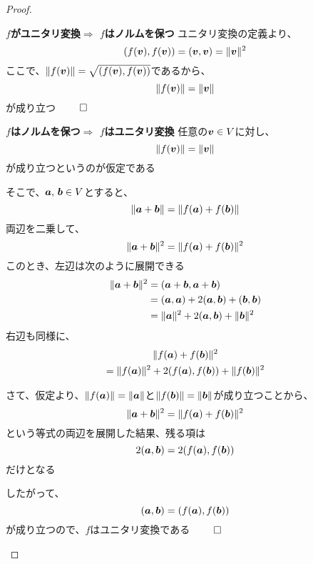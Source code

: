 \documentclass[../../../topic_linear-algebra]{subfiles}
\begin{document}
\begin{proof}
  \begin{subpattern}{\bfseries $f$がユニタリ変換$\Longrightarrow$ $f$はノルムを保つ}
    ユニタリ変換の定義より、
    \begin{equation*}
      (f(\vb*{v}),f(\vb*{v})) = (\vb*{v},\vb*{v}) = \|\vb*{v}\|^2
    \end{equation*}
    ここで、$\|f(\vb*{v})\| = \sqrt{(f(\vb*{v}),f(\vb*{v}))}$であるから、
    \begin{equation*}
      \|f(\vb*{v})\| = \|\vb*{v}\|
    \end{equation*}
    が成り立つ $\qed$
  \end{subpattern}

  \begin{subpattern}{\bfseries $f$はノルムを保つ$\Longrightarrow$ $f$はユニタリ変換}
    任意の$\vb*{v} \in V$に対し、
    \begin{equation*}
      \|f(\vb*{v})\| = \|\vb*{v}\|
    \end{equation*}
    が成り立つというのが仮定である

    そこで、$\vb*{a},\,\vb*{b} \in V$とすると、
    \begin{equation*}
      \|\vb*{a} + \vb*{b} \| = \|f(\vb*{a}) + f(\vb*{b})\|
    \end{equation*}
    両辺を二乗して、
    \begin{equation*}
      \|\vb*{a} + \vb*{b} \|^2 = \|f(\vb*{a}) + f(\vb*{b})\|^2
    \end{equation*}
    このとき、左辺は次のように展開できる
    \begin{align*}
      \|\vb*{a} + \vb*{b} \|^2 & = (\vb*{a} + \vb*{b},\vb*{a} + \vb*{b})                      \\
                               & = (\vb*{a},\vb*{a}) + 2(\vb*{a},\vb*{b}) + (\vb*{b},\vb*{b}) \\
                               & = \|\vb*{a}\|^2 + 2(\vb*{a},\vb*{b}) + \|\vb*{b}\|^2
    \end{align*}
    右辺も同様に、
    \begin{multline*}
      \|f(\vb*{a}) + f(\vb*{b})\|^2 \\= \|f(\vb*{a})\|^2 + 2(f(\vb*{a}),f(\vb*{b})) + \|f(\vb*{b})\|^2
    \end{multline*}

    さて、仮定より、$\|f(\vb*{a})\| = \|\vb*{a}\|$と$\|f(\vb*{b})\| = \|\vb*{b}\|$が成り立つことから、
    \begin{equation*}
      \|\vb*{a} + \vb*{b} \|^2 = \|f(\vb*{a}) + f(\vb*{b})\|^2
    \end{equation*}
    という等式の両辺を展開した結果、残る項は
    \begin{equation*}
      2 (\vb*{a},\vb*{b}) = 2(f(\vb*{a}),f(\vb*{b}))
    \end{equation*}
    だけとなる

    したがって、
    \begin{equation*}
      (\vb*{a},\vb*{b}) = (f(\vb*{a}),f(\vb*{b}))
    \end{equation*}
    が成り立つので、$f$はユニタリ変換である $\qed$
  \end{subpattern}
\end{proof}
\end{document}
